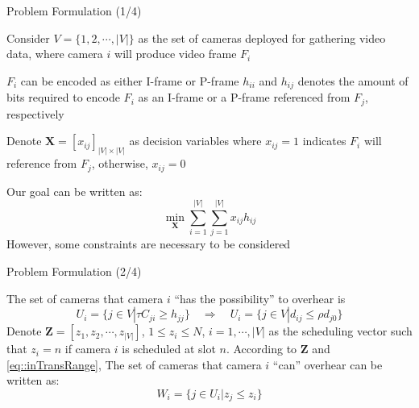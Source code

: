 \begin{frame}{Problem Formulation (1/4)}
\begin{itemize}
	\myItem Consider $V=\{1,2,\cdots,|V|\}$ as the set of cameras deployed for gathering video data, where camera $i$ will produce video frame $F_i$
	\begin{itemize}
		\mySubItem $F_i$ can be encoded as either I-frame or P-frame
		\mySubItem $h_{ii}$ and $h_{ij}$ denotes the amount of bits required to encode $F_i$ as an I-frame or a P-frame referenced from $F_j$, respectively
	\end{itemize}	
	\myItem Denote $\mathbf{X}=[x_{ij}]_{|V| \times |V|}$ as decision variables where $x_{ij} = 1$ indicates $F_i$ will reference from $F_j$, otherwise, $x_{ij} = 0$
	\begin{itemize}
		\mySubItem Our goal can be written as:
		\begin{equation}
			\underset{\mathbf{X}}{\min} \sum_{i=1}^{|V|} \sum_{j =1}^{|V|}  x_{ij} h_{ij}
		\end{equation}
		\mySubItem However, some constraints are necessary to be considered
	\end{itemize}
\end{itemize}
\end{frame}
\begin{frame}{Problem Formulation (2/4)}
\begin{itemize}
	\myItem The set of cameras that camera $i$ ``has the possibility'' to overhear is
	\begin{equation}
		U_i = \{ j \in V | \tau C_{ji} \geq h_{jj} \} \quad \Rightarrow \quad U_i = \{ j \in V | d_{ij} \leq \rho d_{j0} \}
		\label{eq::inTransRange}
	\end{equation}
	\myItem Denote ${\mathbf{Z} = [z_1, z_2, \cdots, z_{|V|}]}$, ${1 \leq z_i \leq N}$, ${i=1,\cdots,|V|}$ as the scheduling vector such that ${z_i = n}$ if camera $i$ is scheduled at slot $n$.
	\myItem According to $\mathbf{Z}$ and \eqref{eq::inTransRange}, The set of cameras that camera $i$ ``can'' overhear can be written as:
	\begin{equation}
		W_i = \{ j \in U_i | z_j \leq z_i \}
		\label{eq::prevSet}
	\end{equation}
\end{itemize}
\end{frame}
